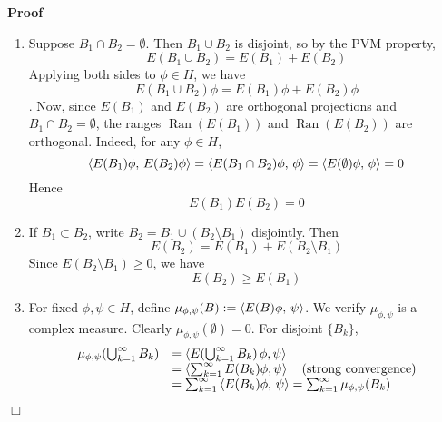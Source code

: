 \documentclass{article}
\newcommand{\assign}{:=}
\newcommand{\tmop}[1]{\ensuremath{\operatorname{#1}}}
\newenvironment{enumeratealpha}{\begin{enumerate}[a{\textup{)}}] }{\end{enumerate}}
\newenvironment{proof}{\noindent\textbf{Proof\ }}{\hspace*{\fill}$\Box$\medskip}
\newcommand{\1}{\mathbbm{1}}
\newcommand{\ip}[2]{\left\langle #1, \hspace{0.17em} #2  \right\rangle}
\newcommand{\Ran}{\tmop{Ran}}
\begin{document}
\begin{proof}
  \begin{enumeratealpha}
    \item Suppose $B_1 \cap B_2 = \emptyset$. Then $B_1 \cup B_2$ is disjoint,
    so by the PVM property,
    \begin{equation}
      E (B_1 \cup B_2) = E (B_1) + E (B_2)
    \end{equation}
    Applying both sides to $\phi \in H$, we have
    \begin{equation}
      E (B_1 \cup B_2) \phi = E (B_1) \phi + E (B_2) \phi
    \end{equation}
    . Now, since $E (B_1)$ and $E (B_2)$ are orthogonal projections and $B_1
    \cap B_2 = \emptyset$, the ranges $\Ran (E (B_1))$ and $\Ran (E (B_2))$
    are orthogonal. Indeed, for any $\phi \in H$,
    \begin{equation}
      \ip{E (B_1) \phi}{E (B_2) \phi} = \ip{E (B_1 \cap B_2) \phi}{\phi} =
      \ip{E (\emptyset) \phi}{\phi} = 0
    \end{equation}
    Hence
    \begin{equation}
      E (B_1) E (B_2) = 0
    \end{equation}
    \item If $B_1 \subset B_2$, write $B_2 = B_1 \cup (B_2 \setminus B_1)$
    disjointly. Then
    \begin{equation}
      E (B_2) = E (B_1) + E (B_2 \setminus B_1)
    \end{equation}
    Since $E (B_2 \setminus B_1) \geq 0$, we have
    \begin{equation}
      E (B_2) \geq E (B_1)
    \end{equation}
    \item For fixed $\phi, \psi \in H$, define $\mu_{\phi, \psi} (B) \assign
    \ip{E (B) \phi}{\psi}$. We verify $\mu_{\phi, \psi}$ is a complex measure.
    Clearly $\mu_{\phi, \psi} (\emptyset) = 0$. For disjoint $\{B_k \}$,
    \begin{equation}
      \begin{array}{ll}
        \mu_{\phi, \psi} \hspace{-0.17em} \left( \bigcup_{k = 1}^{\infty} B_k
        \right) & = \left\langle E \hspace{-0.17em} \left( \bigcup_{k =
        1}^{\infty} B_k \right) \phi, \psi \right\rangle\\
        & = \left\langle \sum_{k = 1}^{\infty} E (B_k) \phi, \psi
        \right\rangle \quad \text{(strong convergence)}\\
        & = \sum_{k = 1}^{\infty} \ip{E (B_k) \phi}{\psi} = \sum_{k =
        1}^{\infty} \mu_{\phi, \psi} (B_k)
      \end{array}
    \end{equation}
  \end{enumeratealpha}
  
\end{proof}
\end{document}
